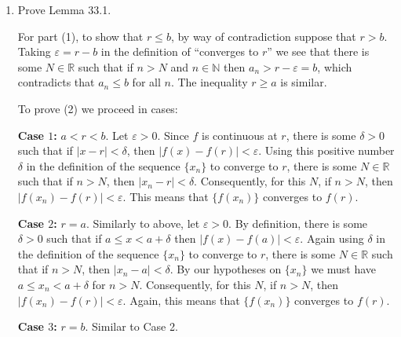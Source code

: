 \documentclass[12pt]{amsart}
\def\d{\delta}
\def\e{\varepsilon}
\newcommand{\R}{{\mathbb{R}}}
\newcommand{\N}{\mathbb{N}}
\numberwithin{equation}{section}
\theoremstyle{plain} %
\theoremstyle{definition}
\theoremstyle{remark}
\begin{document}
\begin{enumerate}
\item Prove Lemma 33.1.

\begin{framed}
For part (1), to show that $r\leq b$, by way of contradiction suppose that $r>b$. Taking $\e=r-b$ in the definition of ``converges to $r$'' we see that there is some $N\in \R$ such that if $n>N$ and $n\in \N$ then $a_n> r-\e =b$, which contradicts that $a_n\leq b$ for all $n$. The inequality $r\geq a$ is similar.

To prove (2) we proceed in cases:

{\bf Case $1$:} $a < r <  b$.  Let $\e >0$. Since $f$ is continuous at $r$, there is some $\d>0$ such that if $|x-r|<\d$, then $|f(x)-f(r)|<\e$. Using this positive number $\d$ in the definition of the sequence $\{x_n\}$ to converge to $r$, there is some $N\in \R$ such that if $n>N$, then $|x_n-r|<\d$. Consequently, for this $N$, if $n>N$, then $|f(x_n)-f(r)|<\e$. This means that $\{f(x_n)\}$ converges to $f(r)$.

{\bf Case $2$:} $r = a$. Similarly to above, let $\e>0$. By definition, there is some $\d>0$ such that if $a\leq x < a+\delta$ then $|f(x)-f(a)|<\e$. Again using $\d$ in the definition of the sequence $\{x_n\}$ to converge to $r$, there is some $N\in \R$ such that if $n>N$, then $|x_n-a|<\d$. By our hypotheses on $\{x_n\}$ we must have $a\leq x_n < a+\d$ for $n>N$. Consequently, for this $N$, if $n>N$, then $|f(x_n)-f(r)|<\e$. Again, this means that $\{f(x_n)\}$ converges to $f(r)$.

{\bf Case $3$:} $r = b$. Similar to Case 2.
\end{framed}






\end{enumerate}
\end{document}
